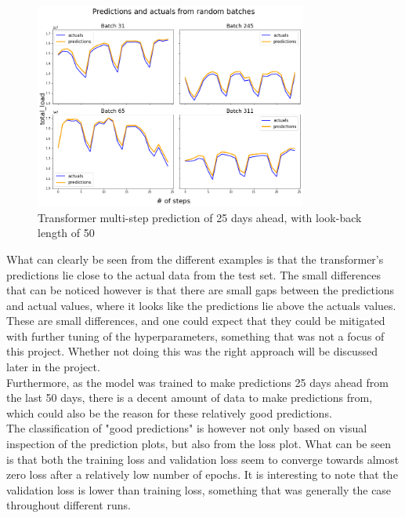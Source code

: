 \documentclass[main.tex]{subfiles}
\begin{document}
\begin{figure}[H]
    \centering
    \includegraphics[width=0.8\textwidth]{TransformerPlots/transformerpredictionsgood.png}
    \caption{Transformer multi-step prediction of 25 days ahead, with look-back length of 50}
    \label{fig:transformer_pred1}
\end{figure}

What can clearly be seen from the different examples is that the transformer's predictions lie close to the actual data from the test set. The small differences that can be noticed however is that there are small gaps between the predictions and actual values, where it looks like the predictions lie above the actuals values. These are small differences, and one could expect that they could be mitigated with further tuning of the hyperparameters, something that was not a focus of this project. Whether not doing this was the right approach will be discussed later in the project. \\
Furthermore, as the model was trained to make predictions 25 days ahead from the last 50 days, there is a decent amount of data to make predictions from, which could also be the reason for these relatively good predictions.\\
The classification of "good predictions" is however not only based on visual inspection of the prediction plots, but also from the loss plot. What can be seen is that both the training loss and validation loss seem to converge towards almost zero loss after a relatively low number of epochs. It is interesting to note that the validation loss is lower than training loss, something that was generally the case throughout different runs.
\end{document}
